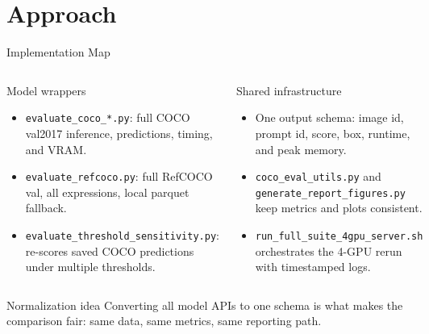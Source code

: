 \documentclass[aspectratio=169,professionalfonts]{beamer}
\begin{document}
\section{Approach}

\begin{frame}{Implementation Map}
  \begin{columns}[T,onlytextwidth]
    \begin{block}{Model wrappers}
      \small
      \begin{itemize}
        \item \texttt{evaluate\_coco\_*.py}: full COCO val2017 inference, predictions, timing, and VRAM.
        \item \texttt{evaluate\_refcoco.py}: full RefCOCO val, all expressions, local parquet fallback.
        \item \texttt{evaluate\_threshold\_sensitivity.py}: re-scores saved COCO predictions under multiple thresholds.
      \end{itemize}
    \end{block}

    \begin{block}{Shared infrastructure}
      \small
      \begin{itemize}
        \item One output schema: image id, prompt id, score, box, runtime, and peak memory.
        \item \texttt{coco\_eval\_utils.py} and \texttt{generate\_report\_figures.py} keep metrics and plots consistent.
        \item \texttt{run\_full\_suite\_4gpu\_server.sh} orchestrates the 4-GPU rerun with timestamped logs.
      \end{itemize}
    \end{block}
  \end{columns}

  \vspace{0.35em}
  \begin{alertblock}{Normalization idea}
    Converting all model APIs to one schema is what makes the comparison fair: same data, same metrics, same reporting path.
  \end{alertblock}
\end{frame}
\end{document}
